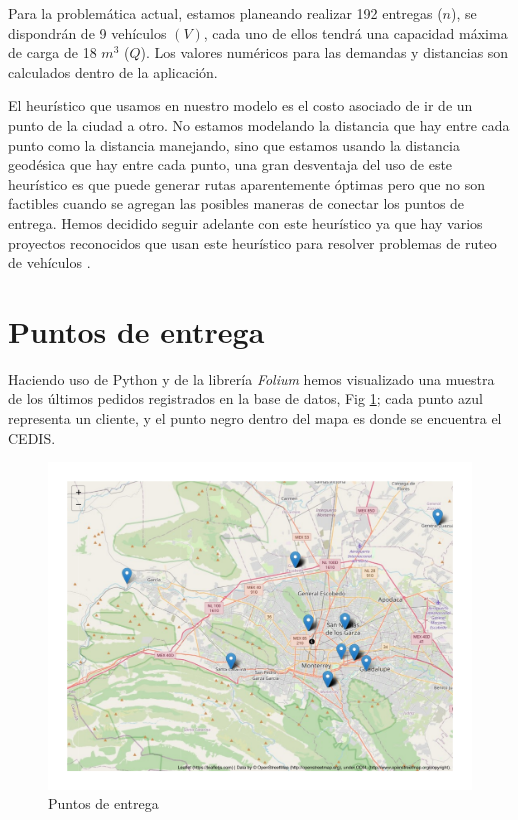 \documentclass[journal]{IEEEtran}
\begin{document}
        Para la problemática actual, estamos planeando realizar 192 entregas ($n$), se dispondrán de 9 vehículos $(V)$, cada uno de ellos tendrá una capacidad máxima de carga de 18 $m^3$ ($Q$). Los valores numéricos para las demandas y distancias son calculados dentro de la aplicación.
        
        El heurístico que usamos en nuestro modelo es el costo asociado de ir de un punto de la ciudad a otro. No estamos modelando la distancia que hay entre cada punto como la distancia manejando, sino que estamos usando la distancia geodésica que hay entre cada punto, una gran desventaja del uso de este heurístico es que puede generar rutas aparentemente óptimas pero que no son factibles cuando se agregan las posibles maneras de conectar los puntos de entrega. Hemos decidido seguir adelante con este heurístico ya que hay varios proyectos reconocidos que usan este heurístico para resolver problemas de ruteo de vehículos \cite{ERDOGAN201762}.
    
    \section{Puntos de entrega}
        
        Haciendo uso de Python y de la librería \emph{Folium} hemos visualizado una muestra de los últimos pedidos registrados en la base de datos, Fig \ref{puntos-entrega-mapa}; cada punto azul representa un cliente, y el punto negro dentro del mapa es donde se encuentra el CEDIS.
        
        \begin{figure}[!ht]
            \centering
            \includegraphics[scale=0.3]{img/deliveries-plot.pdf}
            \caption{Puntos de entrega} 
            \label{puntos-entrega-mapa}
        \end{figure}
    
\end{document}
